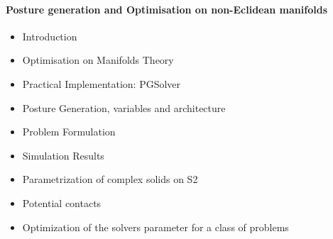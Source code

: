 \documentclass{article}
\begin{document}
\paragraph { Posture generation and Optimisation on non-Eclidean manifolds }
\begin{itemize}
  \item{Introduction}
  \item{Optimisation on Manifolds Theory}
  \item{Practical Implementation: PGSolver}
  \item{Posture Generation, variables and architecture}
  \item{Problem Formulation}
  \item{Simulation Results}
  \item{Parametrization of complex solids on S2}
  \item{Potential contacts}
  \item{Optimization of the solvers parameter for a class of problems}
\end{itemize}
\end{document}
